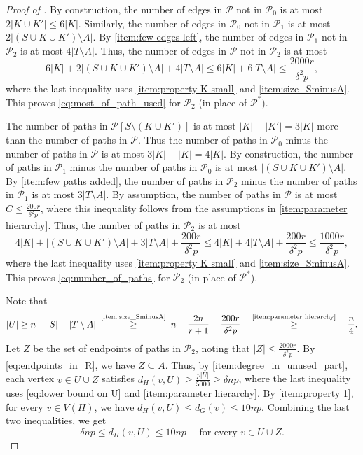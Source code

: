 \documentclass[10pt,a4paper,reqno]{amsart}
\begin{document}
\begin{proof}[Proof of ]
By construction, the number of edges in $\mathcal{P}$ not in $\mathcal{P}_0$ is at most $2|K \cup K'|\le 6|K|$. Similarly, the number of edges in $\mathcal{P}_0$ not in $\mathcal{P}_1$ is at most $2|(S\cup K \cup K')\setminus A|$. By \ref{item:few edges left}, the number of edges in $\mathcal{P}_1$ not in $\mathcal{P}_2$ is at most $4|T\setminus A|$. Thus, the number of edges in $\mathcal{P}$ not in $\mathcal{P}_2$ is at most 
\[
6|K| + 2|(S\cup K \cup K')\setminus A| + 4|T\setminus A|\le 6|K| + 6|T\setminus A|\le \frac{2000r}{\delta^2 p},
\]
where the last inequality uses \ref{item:property K small} and \ref{item:size_SminusA}. This proves \ref{eq:most_of_path_used} for $\mathcal{P}_2$ (in place of $\mathcal{P}^*$). 

The number of paths in $\mathcal{P}[S \setminus (K \cup K')]$ is at most $|K| + |K'| = 3|K|$ more than the number of paths in $\mathcal{P}$. Thus the number of paths in $\mathcal{P}_0$ minus the number of paths in $\mathcal{P}$ is at most $3|K|+|K| = 4|K|$.
By construction, the number of paths in $\mathcal{P}_1$ minus the number of paths in $\mathcal{P}_0$ is at most $|(S\cup K \cup K')\setminus A|$. By \ref{item:few paths added}, the number of paths in $\mathcal{P}_2$ minus the number of paths in $\mathcal{P}_1$ is at most $3|T\setminus A|$. By assumption, the number of paths in $\mathcal{P}$ is at most $C \le \frac{200r}{\delta^2 p}$, where this inequality follows from the assumptions in \ref{item:parameter hierarchy}. Thus, the number of paths in $\mathcal{P}_2$ is at most 
\[
4|K| + |(S\cup K \cup K')\setminus A| + 3|T\setminus A| + \frac{200r}{\delta^2 p}\le 4|K| + 4|T\setminus A| + \frac{200r}{\delta^2 p}\le \frac{1000r}{\delta^2 p},
\]
where the last inequality uses \ref{item:property K small} and \ref{item:size_SminusA}.
This proves \ref{eq:number_of_paths} for $\mathcal{P}_2$ (in place of $\mathcal{P}^*$). 

Note that 
\begin{equation}\label{eq:lower bound on U}
    |U|\ge n-|S|-|T\setminus A| \;\overset{\text{\ref{item:size_SminusA}}}{\ge}\; n-\frac{2n}{r+1} -\frac{200r}{\delta^2 p}
    \quad\overset{\text{\ref{item:parameter hierarchy}}}{\ge} \quad\frac{n}{4}. 
\end{equation}
Let $Z$ be the set of endpoints of paths in $\mathcal{P}_2$, noting that $|Z| \le \frac{2000r}{\delta^2p}$. By \ref{eq:endpoints_in_R}, we have $Z \subseteq A$. Thus, by \ref{item:degree_in_unused_part}, each vertex $v \in U\cup Z$ satisfies $d_H(v,U) \ge \frac{p|U|}{5000} \ge \delta np$, where the last inequality uses \eqref{eq:lower bound on U} and \ref{item:parameter hierarchy}. By \ref{item:property 1}, for every $v\in V(H)$, we have $d_H(v,U) \le d_G(v) \le 10np$. Combining the last two inequalities, we get 
\begin{equation}\label{eq:bounds on degree to U}
    \delta np \le d_H(v,U) \le 10np \quad \text{ for every }  v \in U\cup Z.
\end{equation}


\end{proof}
\end{document}

